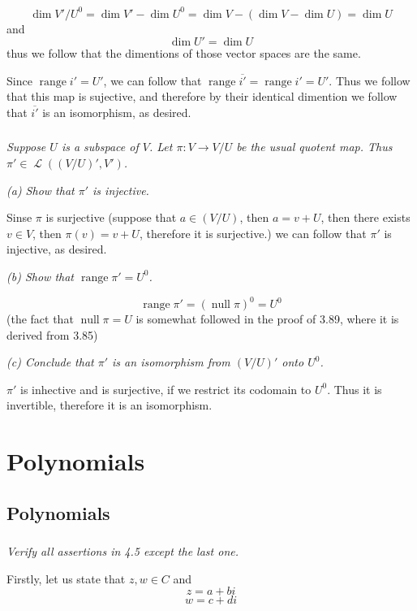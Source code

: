 \documentclass[11pt,oneside,titlepage]{book}
\DeclareMathOperator \map {\mathcal {L}}
\DeclareMathOperator \ns {null}
\DeclareMathOperator \range {range}
\begin{document}
$$\dim V'/U^0 = \dim V' - \dim U^0 = \dim V - (\dim V - \dim U) = \dim U$$
and
$$\dim U' = \dim U$$
thus we follow that the dimentions of those vector spaces are the same.

Since $\range i' = U'$, we can follow that $\range \overline{i'} = \range i' = U'$. Thus we
follow that this map is sujective, and therefore by their identical dimention we follow that
$\overline{i'}$ is an isomorphism, as desired.

\subsection{}

\textit{Suppose $U$ is a subspace of $V$. Let $\pi: V \to V/U$ be the usual quotent map.
  Thus $\pi' \in \map((V/U)', V')$.}

\textit{(a) Show that $\pi'$ is injective.}

Sinse $\pi$ is surjective (suppose that $a \in (V/U)$, then $a = v + U$, then there exists
$v \in V$, then $\pi(v) = v + U$, therefore it is surjective.)
we can follow that $\pi'$ is injective, as desired.

\textit{(b) Show that $\range \pi' = U^0$.}

$$\range \pi' = (\ns \pi)^0 = U^0$$
(the fact that $\ns \pi = U$ is somewhat followed in the proof of 3.89, where it is derived from
3.85)

\textit{(c) Conclude that $\pi'$ is an isomorphism from $(V/U)'$ onto $U^0$.}

$\pi'$ is inhective and is surjective, if we restrict its codomain to $U^0$. Thus it is invertible,
therefore it is an isomorphism.

\chapter{Polynomials}

\section{Polynomials}


\subsection{}

\textit{Verify all assertions in 4.5 except the last one.}

Firstly, let us state that $z, w \in C$ and
$$z = a + bi$$
$$w = c + di$$
\end{document}
